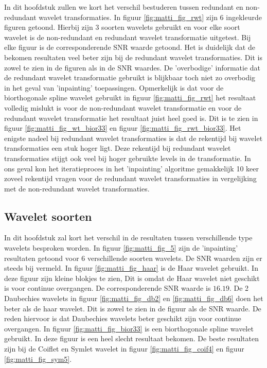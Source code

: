 In dit hoofdstuk zullen we kort het verschil bestuderen tussen redundant en non-redundant wavelet transformaties. In figuur \ref{fig:matti_fig_rwt} zijn 6 ingekleurde figuren getoond. Hierbij zijn 3 soorten wavelets gebruikt en voor elke soort wavelet is de non-redundant en redundant wavelet transformatie uitgetest. Bij elke figuur is de corresponderende SNR waarde getoond. Het is duidelijk dat de bekomen resultaten veel beter zijn bij de redundant wavelet transformaties. Dit is zowel te zien in de figuren als in de SNR waardes. De 'overbodige' informatie dat de redundant wavelet transformatie gebruikt is blijkbaar toch niet zo overbodig in het geval van 'inpainting' toepassingen. Opmerkelijk is dat voor de biorthogonale spline wavelet gebruikt in figuur \ref{fig:matti_fig_rwt} het resultaat volledig mislukt is voor de non-redundant wavelet transformatie en voor de redundant wavelet transformatie het resultaat juist heel goed is. Dit is te zien in figuur \ref{fig:matti_fig_wt_bior33} en figuur \ref{fig:matti_fig_rwt_bior33}.
\newline
\newline
Het enigste nadeel bij redundant wavelet transformaties is dat de rekentijd bij wavelet transformaties een stuk hoger ligt. Deze rekentijd bij redundant wavelet transformaties stijgt ook veel bij hoger gebruikte levels in de transformatie. In ons geval kon het iteratieproces in het 'inpainting' algoritme gemakkelijk 10 keer zoveel rekentijd vragen voor de redundant wavelet transformaties in vergelijking met de non-redundant wavelet transformaties.

\subsection{Wavelet soorten}

In dit hoofdstuk zal kort het verschil in de resultaten tussen verschillende type wavelets besproken worden. In figuur \ref{fig:matti_fig_5} zijn de 'inpainting' resultaten getoond voor 6 verschillende soorten wavelets. De SNR waarden zijn er steeds bij vermeld. In figuur \ref{fig:matti_fig_haar} is de Haar wavelet gebruikt. In deze figuur zijn kleine blokjes te zien, Dit is omdat de Haar wavelet niet geschikt is voor continue overgangen. De corresponderende SNR waarde is $16.19$. De 2 Daubechies wavelets in figuur \ref{fig:matti_fig_db2} en \ref{fig:matti_fig_db6} doen het beter als de haar wavelet. Dit is zowel te zien in de figuur als de SNR waarde. De reden hiervoor is dat Daubechies wavelets beter geschikt zijn voor continue overgangen. In figuur \ref{fig:matti_fig_bior33} is een biorthogonale spline wavelet gebruikt. In deze figuur is een heel slecht resultaat bekomen. De beste resultaten zijn bij de Coiflet en Symlet wavelet in figuur \ref{fig:matti_fig_coif4} en figuur \ref{fig:matti_fig_sym5}.

